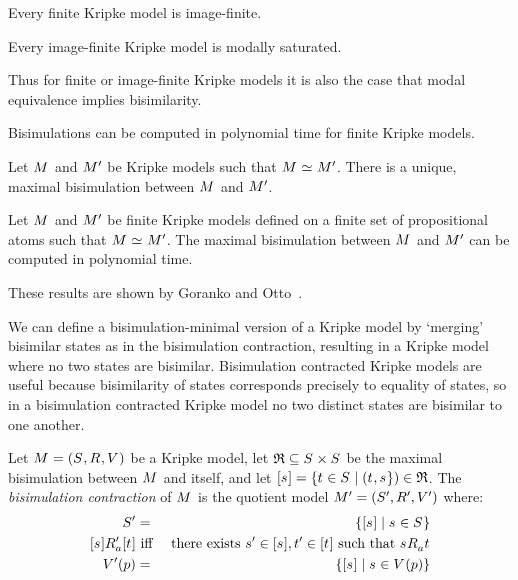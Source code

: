 \begin{proposition}
Every finite Kripke model is image-finite.
\end{proposition}

\begin{proposition}
Every image-finite Kripke model is modally saturated.
\end{proposition}

Thus for finite or image-finite Kripke models it is also the case that modal equivalence implies bisimilarity.

\pagebreak

Bisimulations can be computed in polynomial time for finite Kripke models.

\begin{proposition}
Let $\kModel$ and ${M^{\prime}_{}}$ be Kripke models such that $\kModel \bisimilar \kModelP$.
There is a unique, maximal bisimulation between $\kModel$ and ${M^{\prime}_{}}$.
\end{proposition}

\begin{proposition}
Let $\kModel$ and ${M^{\prime}_{}}$ be finite Kripke models defined on a finite set of propositional atoms such that $\kModel \bisimilar \kModelP$.
The maximal bisimulation between $\kModel$ and ${M^{\prime}_{}}$ can be computed in polynomial time.
\end{proposition}

These results are shown by Goranko and Otto~\cite[pp. 273-274]{goranko:2006}.

We can define a bisimulation-minimal version of a Kripke model by `merging' bisimilar states as in the bisimulation contraction, resulting in a Kripke model where no two states are bisimilar.
Bisimulation contracted Kripke models are useful because bisimilarity of states corresponds precisely to equality of states, so in a bisimulation contracted Kripke model no two distinct states are bisimilar to one another.

\begin{definition}
Let $\kModelAndTuple$ be a Kripke model,
let $\bisimulation \subseteq \kStates \times \kStates$ be the maximal bisimulation between $\kModel$ and itself,
and let ${[\kStateS]} = \{\kStateT \in \kStates \mid (\kStateT, \kStateS\}) \in \bisimulation$.
The {\em bisimulation contraction} of $\kModel$ is the quotient model $\kModelAndTupleP$ where:
\begin{eqnarray*}
    \kStatesP &=& \{{[\kStateS]} \mid \kStateS \in \kStates\}\\
    {[\kStateS]} \kAccessibilityPA {[\kStateT]} &\text{ iff }& \text{there exists } \kStateSP \in {[\kStateS]}, \kStateTP \in {[\kStateT]} \text{ such that } \kStateS \kAccessibilityA \kStateT\\
    \kValuationP(\atomP) &=& \{{[\kStateS]} \mid \kStateS \in \kValuation(\atomP)\}
\end{eqnarray*}
\end{definition}

